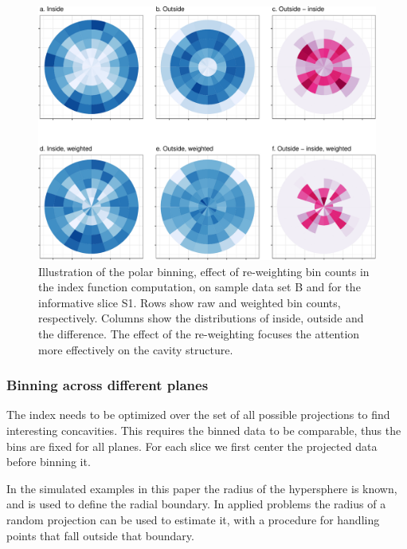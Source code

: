 \documentclass[]{interact}
\theoremstyle{plain}%
\theoremstyle{definition}
\theoremstyle{remark}
\begin{document}
\begin{figure}

{\centering \includegraphics[width=0.9\linewidth]{section_pursuit_files/figure-latex/data_and_densities-1} 

}

\caption{Illustration of the polar binning, effect of re-weighting bin counts in the index function computation, on sample data set B and for the informative slice S1. Rows show raw and weighted bin counts, respectively. Columns show the distributions of inside, outside and the difference. The effect of the re-weighting focuses the attention more effectively on the cavity structure.}\label{fig:data_and_densities}
\end{figure}

\hypertarget{binning-across-different-planes}{%
\subsubsection{Binning across different
planes}\label{binning-across-different-planes}}

The index needs to be optimized over the set of all possible projections
to find interesting concavities. This requires the binned data to be
comparable, thus the bins are fixed for all planes. For each slice we
first center the projected data before binning it.

In the simulated examples in this paper the radius of the hypersphere is
known, and is used to define the radial boundary. In applied problems
the radius of a random projection can be used to estimate it, with a
procedure for handling points that fall outside that boundary.
\end{document}

